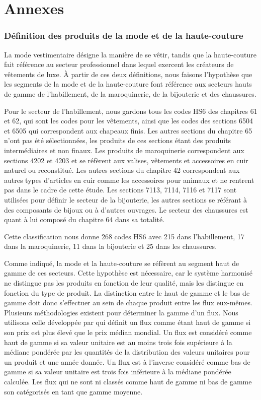 \documentclass[french,10pt,a4paper]{article}
\newenvironment{annexes}{
    \section*{Annexes}
    \addcontentsline{toc}{section}{Annexes}
    \setstretch{2} %
}{
    \setstretch{1} %
}
\begin{document}
\begin{annexes}
\subsubsection*{Définition des produits de la mode et de la haute-couture}
La mode vestimentaire désigne la manière de se vêtir, tandis que la haute-couture fait référence au secteur professionnel dans lequel exercent les créateurs de vêtements de luxe. À partir de ces deux définitions, nous faisons l'hypothèse que les segments de la mode et de la haute-couture font référence aux secteurs hauts de gamme de l'habillement, de la maroquinerie, de la bijouterie et des chaussures.

Pour le secteur de l'habillement, nous gardons tous les codes HS6 des chapitres 61 et 62, qui sont les codes pour les vêtements, ainsi que les codes des sections 6504 et 6505 qui correspondent aux chapeaux finis. Les autres sections du chapitre 65 n'ont pas été sélectionnées, les produits de ces sections étant des produits intermédiaires et non finaux. Les produits de maroquinerie correspondent aux sections 4202 et 4203 et se réfèrent aux valises, vêtements et accessoires en cuir naturel ou reconstitué. Les autres sections du chapitre 42 correspondent aux autres types d'articles en cuir comme les accessoires pour animaux et ne rentrent pas dans le cadre de cette étude. Les sections 7113, 7114, 7116 et 7117 sont utilisées pour définir le secteur de la bijouterie, les autres sections se référant à des composants de bijoux ou à d'autres ouvrages. Le secteur des chaussures est quant à lui composé du chapitre 64 dans sa totalité.

Cette classification nous donne 268 codes HS6 avec 215 dans l'habillement, 17 dans la maroquinerie, 11 dans la bijouterie et 25 dans les chaussures. 

Comme indiqué, la mode et la haute-couture se réfèrent au segment haut de gamme de ces secteurs. Cette hypothèse est nécessaire, car le système harmonisé ne distingue pas les produits en fonction de leur qualité, mais les distingue en fonction du type de produit. La distinction entre le haut de gamme et le bas de gamme doit donc s'effectuer au sein de chaque produit entre les flux eux-mêmes. Plusieurs méthodologies existent pour déterminer la gamme d'un flux. Nous utilisons celle développée par \cite{Fontagne1997} qui définit un flux comme étant haut de gamme si son \og prix\fg{} est plus élevé que le \og prix\fg{} médian mondial. Un flux est considéré comme haut de gamme si sa valeur unitaire est au moins trois fois supérieure à la médiane pondérée par les quantités de la distribution des valeurs unitaires pour un produit et une année donnée. Un flux est à l'inverse considéré comme bas de gamme si sa valeur unitaire est trois fois inférieure à la médiane pondérée calculée. Les flux qui ne sont ni classés comme haut de gamme ni bas de gamme son catégorisés en tant que gamme moyenne. 


\end{annexes}
\end{document}
